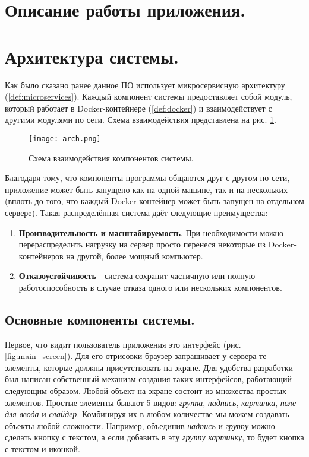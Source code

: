 \clearpage

\section{Описание работы приложения.}

\clearpage

\section{Архитектура системы.}

Как было сказано ранее данное ПО использует микросервисную архитектуру (\ref{def:microservices}). Каждый компонент системы
предоставляет собой модуль, который работает в Docker-контейнере (\ref{def:docker}) и взаимодействует с другими модулями
по сети. Схема взаимодействия представлена на рис. \ref{fig:arch}.

\begin{figure}[h]
    \centering
    \texttt{[image: arch.png]}
    \caption{Схема взаимодействия компонентов системы.}
    \label{fig:arch}
\end{figure}

\noindent Благодаря тому, что компоненты программы общаются друг с другом по сети, приложение может быть запущено как
на одной машине, так и на нескольких (вплоть до того, что каждый Docker-контейнер может быть запущен на отдельном сервере).
Такая распределённая система даёт следующие преимущества:
\begin{enumerate}
    \item \textbf{Производительность и масштабируемость}. При необходимости можно перераспределить нагрузку на сервер
    просто перенеся некоторые из Docker-контейнеров на другой, более мощный компьютер.
    \item \textbf{Отказоустойчивость} - система сохранит частичную или полную работоспособность в случае отказа одного
    или нескольких компонентов.
\end{enumerate}

\subsection{Основные компоненты системы.}

Первое, что видит пользователь приложения это интерфейс (рис. \ref{fig:main_screen}). Для его отрисовки браузер запрашивает
у сервера те элементы, которые должны присутствовать на экране. Для удобства разработки был написан собственный механизм
создания таких интерфейсов, работающий следующим образом. Любой объект на экране состоит из множества простых элементов.
Простые элементы бывают 5 видов: \textit{группа}, \textit{надпись}, \textit{картинка}, \textit{поле для ввода} и
\textit{слайдер}. Комбинируя их в любом количестве мы можем создавать объекты любой сложности. Например, объединив
\textit{надпись} и \textit{группу} можно сделать кнопку с текстом, а если добавить в эту \textit{группу} \textit{картинку},
то будет кнопка с текстом и иконкой.

